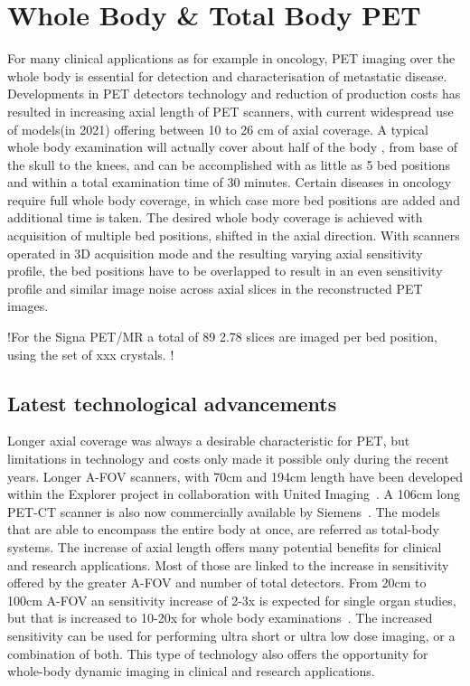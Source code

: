\section{Whole Body \& Total Body PET}
For many clinical applications as for example in oncology, PET imaging over the whole body is essential for detection and characterisation of metastatic disease. Developments in PET detectors technology and reduction of production costs has resulted in increasing axial length of PET scanners, with current widespread use of models(in 2021) offering between 10 to 26 cm of axial coverage.
A typical whole body examination will actually cover about half of the body , from base of the skull to the knees, and can be accomplished with as little as 5 bed positions and within a total examination time of 30 minutes. Certain diseases in oncology require full whole body coverage, in which case more bed positions are added and additional time is taken. 
The desired whole body coverage is achieved with acquisition of multiple bed positions, shifted in the axial direction. With scanners operated in 3D acquisition mode and the resulting varying axial sensitivity profile, the bed positions have to be overlapped to result in an even sensitivity profile and similar image noise across axial slices in the reconstructed PET images. 

!For the Signa PET/MR a total of 89 2.78 slices are imaged per bed position, using the set of xxx crystals. !

\subsection{Latest technological advancements}
Longer axial coverage was always a desirable characteristic for PET, but limitations in technology and costs only made it possible only during the recent years. Longer A-FOV scanners, with 70cm and 194cm length have been developed within the Explorer project in collaboration with United Imaging~\cite{Cherry2017,Badawi2019}. A 106cm long PET-CT scanner is also now commercially available by Siemens~\cite{Siegel2020}.  The models that are able to encompass the entire body at once, are referred as total-body systems. 
The increase of axial length offers many potential benefits for clinical and research applications. Most of those are linked to the increase in sensitivity offered by the greater A-FOV and number of total detectors. From 20cm to 100cm A-FOV an sensitivity increase of 2-3x is expected for single organ studies, but that is increased to 10-20x for whole body examinations~\cite{Vandenberghe2020}. The increased sensitivity can be used for performing ultra short or ultra low dose imaging, or a combination of both. This type of technology also offers the opportunity for whole-body dynamic imaging in clinical and research applications. 
